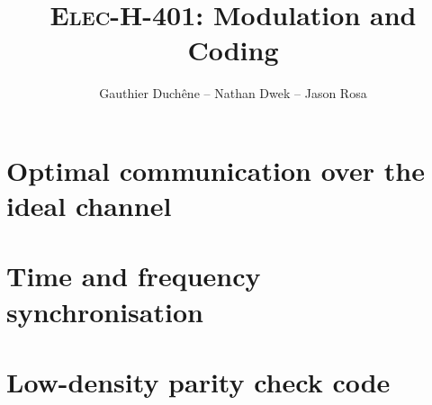 

\title{\textsc{Elec-H-401}: Modulation and Coding}
\author{Gauthier Duchêne -- Nathan Dwek -- Jason Rosa}
\date{}


\maketitle
\tableofcontents
\clearpage
\hypersetup{allcolors = link}

\section{Optimal communication over the ideal channel}


\section{Time and frequency synchronisation}


\section{Low-density parity check code}



